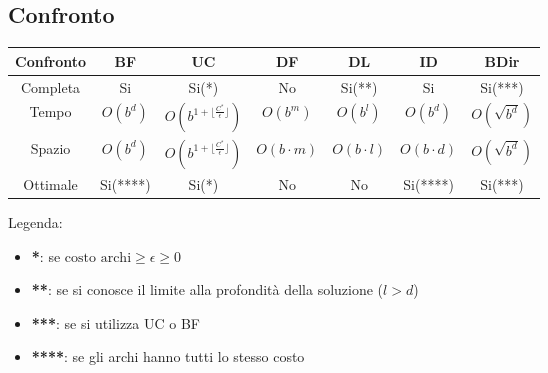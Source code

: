 \subsection{Confronto}
\begin{table}[!h]
	\centering
	\begin{tabular}{|c|c|c|c|c|c|c|}
		\hline
		\textbf{Confronto} & \textbf{BF} & \textbf{UC} & \textbf{DF} & \textbf{DL} & \textbf{ID} & \textbf{BDir}\\
		\hline
		Completa & Si & Si(*) & No & Si(**) & Si & Si(***)\\
		Tempo &$O(b^d)$ &$O(b^{1+\lfloor \frac{C^*}{\epsilon}\rfloor})$ & $O(b^m)$ & $O(b^l)$ & $O(b^d)$ & $O(\sqrt{b^d})$ \\
		Spazio &$O(b^d)$ &$O(b^{1+\lfloor \frac{C^*}{\epsilon}\rfloor})$ & $O(b\cdot m)$ & $O(b\cdot l)$ & $O(b\cdot d)$ & $O(\sqrt{b^d})$\\
		Ottimale & Si(****) & Si(*)& No & No & Si(****)& Si(***)\\
		\hline
	\end{tabular}
\end{table}
Legenda:
\begin{itemize}
	\item  \textbf{*}: se $\text{costo archi} \geq \epsilon \geq 0$
	\item \textbf{**}:  se si conosce il limite alla profondità della soluzione ($l>d$)
	\item \textbf{***}: se si utilizza UC o BF
	\item \textbf{****}: se gli archi hanno tutti lo stesso costo
\end{itemize}
